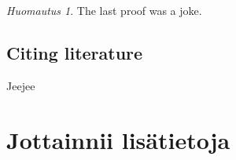 \documentclass[a4paper, 11pt]{report}
\theoremstyle{plain}
\theoremstyle{definition}
\theoremstyle{remark}
\newtheorem{remark}[theorem]{Huomautus}
\begin{document}
\begin{remark}
The last proof was a joke.
\end{remark}



\section{Citing literature}

\nocite{*}
Jeejee

%
%
\printbibliography[heading=bibintoc]




%
%
\appendix

\chapter{Jottainnii lisätietoja}
\end{document}
